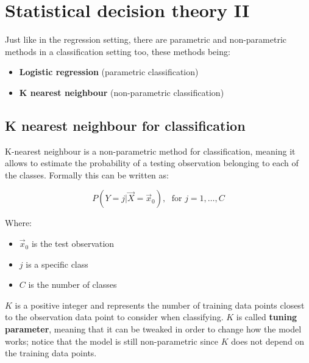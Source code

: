 \graphicspath{{chapters/images/0203/}}

\chapter{Statistical decision theory II}
  Just like in the regression setting, there are parametric and non-parametric
  methods in a classification setting too, these methods being:
  \begin{itemize}
    \item \textbf{Logistic regression} (parametric classification)
    \item \textbf{K nearest neighbour} (non-parametric classification)
  \end{itemize}

  \section{K nearest neighbour for classification}
    K-nearest neighbour is a non-parametric method for classification, meaning
    it allows to estimate the probability of a testing observation belonging to
    each of the classes. Formally this can be written as:

    $$P(Y = j | \vec{X} = \vec{x}_0), \; \text{ for } j = 1, \dots, C$$ 

    Where:
    \begin{itemize}
      \item $\vec{x}_0$ is the test observation
      \item $j$ is a specific class
      \item $C$ is the number of classes
    \end{itemize}
    
    \textbf{$K$} is a positive integer and represents the number of training data points
    closest to the observation data point to consider when classifying. $K$ is
    called \textbf{tuning parameter}, meaning that it can be tweaked in order to
    change how the model works; notice that the model is still non-parametric
    since $K$ does not depend on the training data points.

